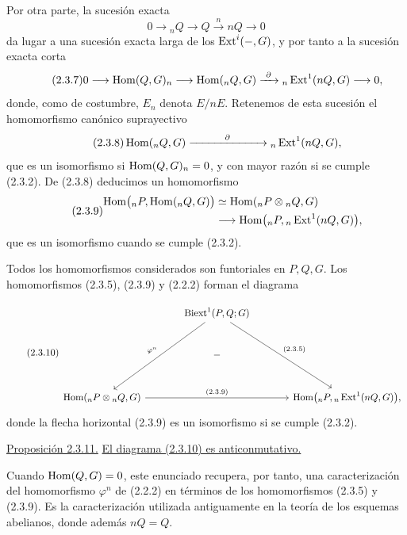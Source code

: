 Por otra parte, la sucesión exacta
\begin{equation}\tag{2.3.6}
 0\longrightarrow{}_nQ\longrightarrow Q
 \xrightarrow{\ n\ }nQ\longrightarrow0
\end{equation}
da lugar a una sucesión exacta larga de los $\operatorname{Ext}^i(-,G)$, y por
tanto a la sucesión exacta corta
\begin{equation}\tag{2.3.7}
 0\longrightarrow\operatorname{Hom}(Q,G)_n
 \longrightarrow\operatorname{Hom}({}_nQ,G)
 \xrightarrow{\ \partial\ }
 {}_n\operatorname{Ext}^1(nQ,G)
 \longrightarrow0,
\end{equation}
donde, como de costumbre, $E_n$ denota $E/nE$. Retenemos de esta
sucesión el homomorfismo canónico suprayectivo
\begin{equation}\tag{2.3.8}
 \operatorname{Hom}({}_nQ,G)
 \xrightarrow{\hspace{3em}\partial\hspace{3em}}
 {}_n\operatorname{Ext}^1(nQ,G),
\end{equation}
que es un isomorfismo si $\operatorname{Hom}(Q,G)_n=0$, y con mayor razón si se
cumple (2.3.2). De (2.3.8) deducimos un homomorfismo
\begin{equation}\tag{2.3.9}
\begin{split}
 \operatorname{Hom}\bigl({}_nP,\operatorname{Hom}({}_nQ,G)\bigr)
 &\simeq
 \operatorname{Hom}({}_nP\otimes{}_nQ,G)\\
 &\longrightarrow
 \operatorname{Hom}\bigl({}_nP,{}_n\operatorname{Ext}^1(nQ,G)\bigr),
\end{split}
\end{equation}
que es un isomorfismo cuando se cumple (2.3.2).

Todos los homomorfismos considerados son funtoriales en $P,Q,G$. Los
homomorfismos (2.3.5), (2.3.9) y (2.2.2) forman el diagrama


\begin{equation}\tag{2.3.10}
\begin{tikzcd}[column sep=large,row sep=large]
 &\Biext^1(P,Q;G)
   \arrow[ddl,"\varphi^n"']
   \arrow[ddr,"(2.3.5)"]&\\
 &-&\\
 \Hom({}_nP\otimes{}_nQ,G)
   \arrow[rr,"(2.3.9)"]&&
 \Hom\bigl({}_nP,{}_n\uExt^1(\sisi{nQnG}{nQ,G})\bigr),
\end{tikzcd}
\end{equation}
donde la flecha horizontal (2.3.9) es un isomorfismo si se cumple
(2.3.2).

\medskip
\noindent\underline{Proposición 2.3.11.}
\underline{El diagrama (2.3.10) es anticonmutativo.}

Cuando $\operatorname{Hom}(Q,G)=0$, este enunciado recupera, por tanto, una
caracterización del homomorfismo $\varphi^n$ de (2.2.2) en términos
de los homomorfismos (2.3.5) y (2.3.9). Es la caracterización
utilizada antiguamente en la teoría de los esquemas abelianos, donde
además $nQ=Q$.
